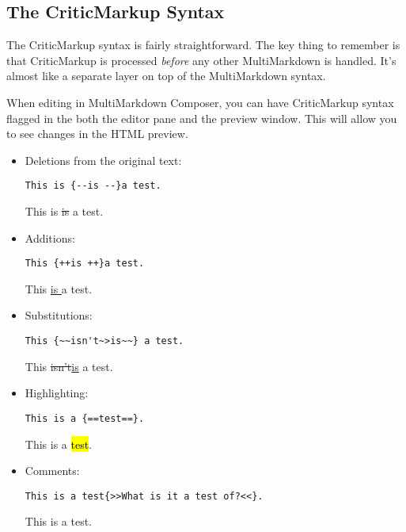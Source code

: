 \subsection{The CriticMarkup Syntax}
\label{thecriticmarkupsyntax}

The CriticMarkup syntax is fairly straightforward. The key thing to remember is that CriticMarkup is processed \emph{before} any other MultiMarkdown is handled. It's almost like a separate layer on top of the MultiMarkdown syntax.

When editing in MultiMarkdown Composer, you can have CriticMarkup syntax flagged in the both the editor pane and the preview window. This will allow you to see changes in the HTML preview.

\begin{itemize}
\item Deletions from the original text:

\begin{verbatim}
This is {--is --}a test.
\end{verbatim}

This is \sout{is }a test.

\item Additions:

\begin{verbatim}
This {++is ++}a test.
\end{verbatim}

This \underline{is }a test.

\item Substitutions:

\begin{verbatim}
This {~~isn't~>is~~} a test.
\end{verbatim}

This \sout{isn't}\underline{is} a test.

\item Highlighting:

\begin{verbatim}
This is a {==test==}.
\end{verbatim}

This is a \hl{test}.

\item Comments:

\begin{verbatim}
This is a test{>>What is it a test of?<<}.
\end{verbatim}

This is a test.

\end{itemize}

